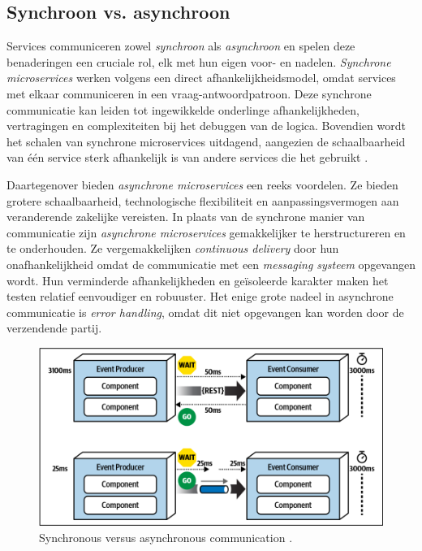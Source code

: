 
 
\subsection{Synchroon vs. asynchroon}
Services communiceren zowel \emph{synchroon} als \emph{asynchroon} en spelen deze benaderingen een cruciale rol, 
elk met hun eigen voor- en nadelen. \emph{Synchrone microservices} werken volgens een direct 
afhankelijkheidsmodel, omdat services met elkaar communiceren in een vraag-antwoordpatroon. 
Deze synchrone communicatie kan leiden tot ingewikkelde onderlinge afhankelijkheden, vertragingen en complexiteiten bij het debuggen 
van de logica. Bovendien wordt het schalen van synchrone microservices uitdagend, 
aangezien de schaalbaarheid van één service sterk afhankelijk is van andere services die het gebruikt \autocite{Bellemare2020}. 
\newline

Daartegenover bieden \emph{asynchrone microservices} een reeks voordelen. Ze bieden grotere schaalbaarheid, technologische 
flexibiliteit en aanpassingsvermogen aan veranderende zakelijke vereisten. 
In plaats van de synchrone manier van communicatie zijn \emph{asynchrone microservices} 
gemakkelijker te herstructureren en te onderhouden. 
Ze vergemakkelijken \emph{continuous delivery} door hun onafhankelijkheid omdat de communicatie 
met een \emph{messaging systeem} opgevangen wordt. Hun verminderde afhankelijkheden en 
geïsoleerde karakter maken het testen relatief eenvoudiger en robuuster.
Het enige grote nadeel in asynchrone communicatie is \emph{error handling}, 
omdat dit niet opgevangen kan worden door de verzendende partij.
\newline

\begin{figure}[H]
  \centering
  \includegraphics[width=.5\textwidth]{../voorstel/img/synchronous_vs_async_calls.png}
  \caption{\label{fig:img_async_vs_sync}Synchronous versus asynchronous communication \autocite[figure 14 -- 13]{MarkRichards2021}.}
\end{figure}


